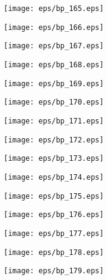 \documentclass{book}
\begin{document}
	\clearpage\begin{figure}[p]
    \centering
	\texttt{[image: eps/bp\_165.eps]}
	\end{figure}
	\clearpage\begin{figure}[p]
    \centering
	\texttt{[image: eps/bp\_166.eps]}
	\end{figure}
	\clearpage\begin{figure}[p]
    \centering
	\texttt{[image: eps/bp\_167.eps]}
	\end{figure}
	\clearpage\begin{figure}[p]
    \centering
	\texttt{[image: eps/bp\_168.eps]}
	\end{figure}
	\clearpage\begin{figure}[p]
    \centering
	\texttt{[image: eps/bp\_169.eps]}
	\end{figure}
	\clearpage\begin{figure}[p]
    \centering
	\texttt{[image: eps/bp\_170.eps]}
	\end{figure}
	\clearpage\begin{figure}[p]
    \centering
	\texttt{[image: eps/bp\_171.eps]}
	\end{figure}
	\clearpage\begin{figure}[p]
    \centering
	\texttt{[image: eps/bp\_172.eps]}
	\end{figure}
	\clearpage\begin{figure}[p]
    \centering
	\texttt{[image: eps/bp\_173.eps]}
	\end{figure}
	\clearpage\begin{figure}[p]
    \centering
	\texttt{[image: eps/bp\_174.eps]}
	\end{figure}
	\clearpage\begin{figure}[p]
    \centering
	\texttt{[image: eps/bp\_175.eps]}
	\end{figure}
	\clearpage\begin{figure}[p]
    \centering
	\texttt{[image: eps/bp\_176.eps]}
	\end{figure}
	\clearpage\begin{figure}[p]
    \centering
	\texttt{[image: eps/bp\_177.eps]}
	\end{figure}
	\clearpage\begin{figure}[p]
    \centering
	\texttt{[image: eps/bp\_178.eps]}
	\end{figure}
	\clearpage\begin{figure}[p]
    \centering
	\texttt{[image: eps/bp\_179.eps]}
	\end{figure}
\end{document}
